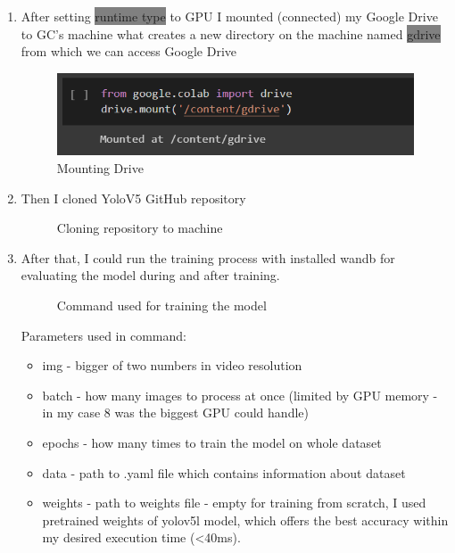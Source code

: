 \begin{enumerate}
    \item After setting \colorbox{Gray}{runtime type} to GPU I mounted (connected) my Google Drive to GC's machine what creates a new directory on the machine named \colorbox{Gray}{gdrive} from which we can access Google Drive
    \newline \begin{figure} [h]
        \centering
        \includegraphics{images/train1}
        \caption{Mounting Drive}
        \label{fig:train1}
    \end{figure}
    \item Then I cloned YoloV5 GitHub repository
    \newline \begin{figure} [h]
        \centering
        \caption{Cloning repository to machine}
        \label{fig:train2}
    \end{figure}
    \item After that, I could run the training process with installed wandb for evaluating the model during and after training.
    \newline \begin{figure} [h]
        \centering
        \caption{Command used for training the model}
        \label{fig:train3}
    \end{figure}
    \newline Parameters used in command:
    \begin{itemize}
        \item img - bigger of two numbers in video resolution
        \item batch - how many images to process at once (limited by GPU memory - in my case 8 was the biggest GPU could handle)
        \item epochs - how many times to train the model on whole dataset
        \item data - path to .yaml file which contains information about dataset
        \item weights - path to weights file - empty for training from scratch, I used pretrained weights of yolov5l model, which offers the best accuracy within my desired execution time (<40ms).
    \end{itemize}
\end{enumerate}

